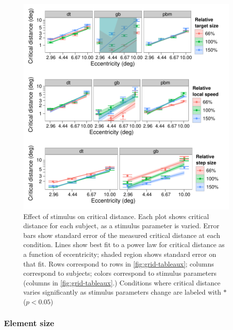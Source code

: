 \documentclass[../manuscript]{subfiles}
\begin{document}
\begin{figure}
  \begin{center}
\includegraphics{figure_3-gridplot}
\end{center}
    \caption{Effect of stimulus on critical distance. Each plot
      shows critical distance for each subject, as a stimulus
      parameter is varied. Error bars show standard error of the
      measured critical distance at each condition. Lines show best
      fit to a power law for critical distance as a function of
      eccentricity; shaded region shows standard error on that
      fit. Rows correspond to rows in \autoref{fig:grid-tableaux};
      columns correspond to subjects; colors correspond to stimulus
      parameters (columns in \autoref{fig:grid-tableaux}.) Conditions
      where critical distance varies significantly as stimulus
      parameters change are labeled with $*$ ($p < 0.05$)
      }
    \label{fig:grid-scaling}
\end{figure}

\subsubsection{Element size}
\label{sec:spatial-frequency}

\end{document}
